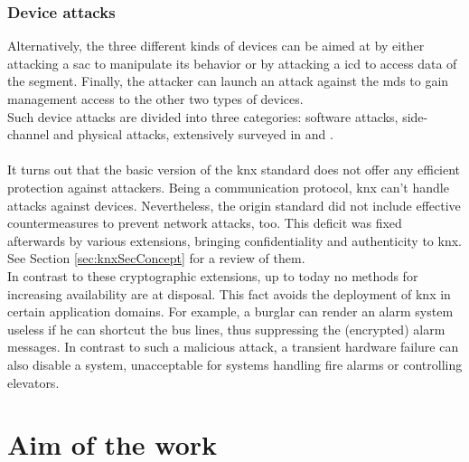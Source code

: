 \subsubsection{Device attacks}
Alternatively, the three different kinds of devices can be aimed at by either attacking a \gls{sac} to manipulate its behavior or by attacking a \gls{icd} to access data of the segment.
Finally, the attacker can launch an attack against the \glspl{md} to gain management access to the other two types of devices.
\\
Such device attacks are divided into three categories: software attacks, side-channel and physical attacks, extensively surveyed in \cite{5332331} and \cite{secAn}.
\\
\\
It turns out that the basic version of the \gls{knx} standard does not offer any efficient protection against attackers.
Being a communication protocol, \gls{knx} can't handle attacks against devices.
Nevertheless, the origin standard did not include effective countermeasures to prevent network attacks, too.
This deficit was fixed afterwards by various extensions, bringing confidentiality and authenticity to \gls{knx}. See Section \ref{sec:knxSecConcept} for a review of them.
\\
In contrast to these cryptographic extensions, up to today no methods for increasing availability are at disposal. This fact avoids the deployment of \gls{knx} in certain application domains.
For example, a burglar can render an alarm system useless if he can shortcut the bus lines, thus suppressing the (encrypted) alarm messages.
In contrast to such a malicious attack, a transient hardware failure can also disable a system, unacceptable for systems handling fire alarms or controlling elevators. 

\section{Aim of the work}

